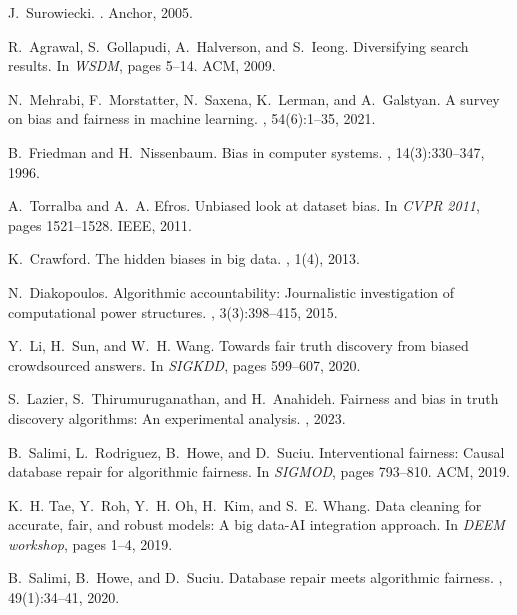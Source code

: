 \documentclass[11pt]{article}
\begin{document}
\begin{thebibliography}{10}
J.~Surowiecki.
.
\newblock Anchor, 2005.

R.~Agrawal, S.~Gollapudi, A.~Halverson, and S.~Ieong.
\newblock Diversifying search results.
\newblock In {\em WSDM}, pages 5--14. ACM, 2009.

N.~Mehrabi, F.~Morstatter, N.~Saxena, K.~Lerman, and A.~Galstyan.
\newblock A survey on bias and fairness in machine learning.
, 54(6):1--35, 2021.

B.~Friedman and H.~Nissenbaum.
\newblock Bias in computer systems.
, 14(3):330--347, 1996.

A.~Torralba and A.~A. Efros.
\newblock Unbiased look at dataset bias.
\newblock In {\em CVPR 2011}, pages 1521--1528. IEEE, 2011.

K.~Crawford.
\newblock The hidden biases in big data.
, 1(4), 2013.

N.~Diakopoulos.
\newblock Algorithmic accountability: Journalistic investigation of computational power structures.
, 3(3):398--415, 2015.

Y.~Li, H.~Sun, and W.~H. Wang.
\newblock Towards fair truth discovery from biased crowdsourced answers.
\newblock In {\em SIGKDD}, pages 599--607, 2020.

S.~Lazier, S.~Thirumuruganathan, and H.~Anahideh.
\newblock Fairness and bias in truth discovery algorithms: An experimental analysis.
, 2023.

B.~Salimi, L.~Rodriguez, B.~Howe, and D.~Suciu.
\newblock Interventional fairness: Causal database repair for algorithmic fairness.
\newblock In {\em {SIGMOD}}, pages 793--810. {ACM}, 2019.

K.~H. Tae, Y.~Roh, Y.~H. Oh, H.~Kim, and S.~E. Whang.
\newblock Data cleaning for accurate, fair, and robust models: A big data-{AI} integration approach.
\newblock In {\em DEEM workshop}, pages 1--4, 2019.

B.~Salimi, B.~Howe, and D.~Suciu.
\newblock Database repair meets algorithmic fairness.
, 49(1):34--41, 2020.


\end{thebibliography}
\end{document}
